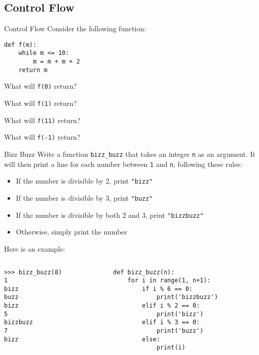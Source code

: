 \documentclass[9pt]{beamer}
\begin{document}
\subsection{Control Flow}
\begin{frame}[fragile]{Control Flow}
  Consider the following function:
  \begin{lstlisting}
def f(m):
    while m <= 10:
        m = m + m + 2
    return m
  \end{lstlisting}

  What will {\tt f(0)} return?

  What will {\tt f(1)} return?

  What will {\tt f(11)} return?

  What will {\tt f(-1)} return?

\end{frame}

\begin{frame}[fragile]{Bizz Buzz}
  Write a function {\tt bizz\_buzz} that takes an integer {\tt n} as an
  argument. It will then print a line for each number between {\tt 1} and
  {\tt n}, following these rules:
  \begin{itemize}
    \item
      If the number is divisible by 2, print {\tt "bizz"}
    \item
      If the number is divisible by 3, print {\tt "buzz"}
    \item
      If the number is divisible by both 2 and 3, print {\tt "bizzbuzz"}
    \item
      Otherwise, simply print the number
  \end{itemize}

  Here is an example:
  \begin{columns}
    \begin{column}{0.4\textwidth}
      \begin{lstlisting}[numbers=none, frame=none, xleftmargin=0pt]
>>> bizz_buzz(8)
1
bizz
buzz
bizz
5
bizzbuzz
7
bizz
      \end{lstlisting}
    \end{column}
    \begin{column}{0.6\textwidth}
      \pause
      \begin{lstlisting}
def bizz_buzz(n):
    for i in range(1, n+1):
        if i % 6 == 0:
            print('bizzbuzz')
        elif i % 2 == 0:
            print('bizz')
        elif i % 3 == 0:
            print('buzz')
        else:
            print(i)
      \end{lstlisting}
    \end{column}
  \end{columns}
\end{frame}
\end{document}
